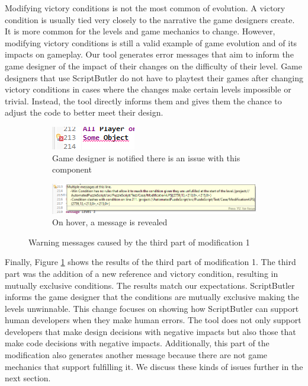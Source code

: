 Modifying victory conditions is not the most common of evolution. A victory condition is usually tied very closely to the narrative the game designers create. It is more common for the levels and game mechanics to change. However, modifying victory conditions is still a valid example of game evolution and of its impacts on gameplay. Our tool generates error messages that aim to inform the game designer of the impact of their changes on the difficulty of their level. Game designers that use ScriptButler do not have to playtest their games after changing victory conditions in cases where the changes make certain levels impossible or trivial. Instead, the tool directly informs them and gives them the chance to adjust the code to better meet their design.

\begin{figure}[!t]
    \begin{subfigure}{1\textwidth}
        \centering
        \includegraphics[scale=1.25]{images/case_results/Modification_1_Results_part3_IDE.png}
        \caption{Game designer is notified there is an issue with this component}
    \end{subfigure}
    \begin{subfigure}{1\textwidth}
        \centering
        \includegraphics[scale=0.9]{images/case_results/Modification_1_Results_part3.png}
        \caption{On hover, a message is revealed}
    \end{subfigure}
    \caption{Warning messages caused by the third part of modification 1}
    \label{fig:modification_1_results_part3}
\end{figure}

Finally, Figure \ref{fig:modification_1_results_part3} shows the results of the third part of modification 1. The third part was the addition of a new reference and victory condition, resulting in mutually exclusive conditions. The results match our expectations. ScriptButler informs the game designer that the conditions are mutually exclusive making the levels unwinnable. This change focuses on showing how ScriptButler can support human developers when they make human errors. The tool does not only support developers that make design decisions with negative impacts but also those that make code decisions with negative impacts. Additionally, this part of the modification also generates another message because there are not game mechanics that support fulfilling it. We discuss these kinds of issues further in the next section. 

